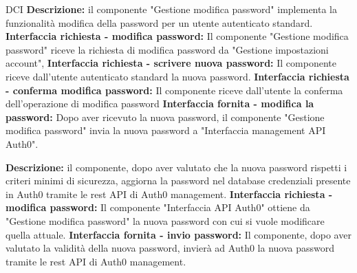 \begin{listaPersonale}{DCI}
    \textbf{Descrizione:} il componente "Gestione modifica password" implementa la funzionalità modifica della password per un utente autenticato standard.
    \textbf{Interfaccia richiesta - modifica password:} Il componente "Gestione modifica password" riceve la richiesta di modifica password da "Gestione impostazioni account",
    \textbf{Interfaccia richiesta - scrivere nuova password:} Il componente riceve dall'utente autenticato standard la nuova password.
    \textbf{Interfaccia richiesta - conferma modifica password:} Il componente riceve dall'utente la conferma dell'operazione di modifica password
    \textbf{Interfaccia fornita - modifica la password:} Dopo aver ricevuto la nuova password, il componente "Gestione modifica password" invia la nuova password a "Interfaccia management API Auth0".


    \textbf{Descrizione:} il componente, dopo aver valutato che la nuova password rispetti i criteri minimi di sicurezza, aggiorna la password nel database credenziali presente in Auth0 tramite le rest API di Auth0 management.
    \textbf{Interfaccia richiesta - modifica password:} Il componente "Interfaccia API Auth0" ottiene da "Gestione modifica password" la nuova password con cui si vuole modificare quella attuale.
    \textbf{Interfaccia fornita - invio password:} Il componente, dopo aver valutato la validità della nuova password, invierà ad Auth0 la nuova password tramite le rest API di Auth0 management.



\end{listaPersonale}
